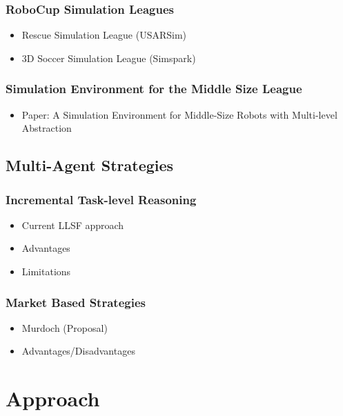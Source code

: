 \documentclass[a4paper,11pt]{article}
\begin{document}
\subsubsection{RoboCup Simulation Leagues}
\begin{itemize}
\item Rescue Simulation League (USARSim)
\item 3D Soccer Simulation League (Simspark)
\end{itemize}
\subsubsection{Simulation Environment for the Middle Size League}
\begin{itemize}
\item Paper: A Simulation Environment for Middle-Size Robots with Multi-level Abstraction
\end{itemize}
\subsection{Multi-Agent Strategies}
\subsubsection{Incremental Task-level Reasoning}
\begin{itemize}
\item Current LLSF approach
\item Advantages
\item Limitations
\end{itemize}
\subsubsection{Market Based Strategies}
\begin{itemize}
\item Murdoch (Proposal)
\item Advantages/Disadvantages
\end{itemize}


\section{Approach}
\end{document}
